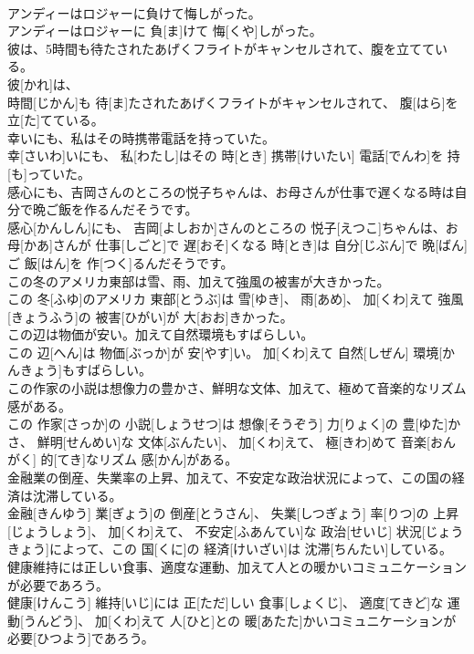 \documentclass[8pt]{extreport}
\begin{document}
\begin{CJK}{UTF8}{min}
\\	アンディーはロジャーに負けて悔しがった。	
\\	アンディーはロジャーに 負[ま]けて 悔[くや]しがった。
\\	彼は、5時間も待たされたあげくフライトがキャンセルされて、腹を立てている。	
\\	彼[かれ]は、 
\\	時間[じかん]も 待[ま]たされたあげくフライトがキャンセルされて、 腹[はら]を 立[た]てている。
\\	幸いにも、私はその時携帯電話を持っていた。	
\\	幸[さいわ]いにも、 私[わたし]はその 時[とき] 携帯[けいたい] 電話[でんわ]を 持[も]っていた。
\\	感心にも、吉岡さんのところの悦子ちゃんは、お母さんが仕事で遅くなる時は自分で晩ご飯を作るんだそうです。	
\\	感心[かんしん]にも、 吉岡[よしおか]さんのところの 悦子[えつこ]ちゃんは、お 母[かあ]さんが 仕事[しごと]で 遅[おそ]くなる 時[とき]は 自分[じぶん]で 晩[ばん]ご 飯[はん]を 作[つく]るんだそうです。
\\	この冬のアメリカ東部は雪、雨、加えて強風の被害が大きかった。	
\\	この 冬[ふゆ]のアメリカ 東部[とうぶ]は 雪[ゆき]、 雨[あめ]、 加[くわ]えて 強風[きょうふう]の 被害[ひがい]が 大[おお]きかった。
\\	この辺は物価が安い。加えて自然環境もすばらしい。	
\\	この 辺[へん]は 物価[ぶっか]が 安[やす]い。 加[くわ]えて 自然[しぜん] 環境[かんきょう]もすばらしい。
\\	この作家の小説は想像力の豊かさ、鮮明な文体、加えて、極めて音楽的なリズム感がある。	
\\	この 作家[さっか]の 小説[しょうせつ]は 想像[そうぞう] 力[りょく]の 豊[ゆた]かさ、 鮮明[せんめい]な 文体[ぶんたい]、 加[くわ]えて、 極[きわ]めて 音楽[おんがく] 的[てき]なリズム 感[かん]がある。
\\	金融業の倒産、失業率の上昇、加えて、不安定な政治状況によって、この国の経済は沈滞している。	
\\	金融[きんゆう] 業[ぎょう]の 倒産[とうさん]、 失業[しつぎょう] 率[りつ]の 上昇[じょうしょう]、 加[くわ]えて、 不安定[ふあんてい]な 政治[せいじ] 状況[じょうきょう]によって、この 国[くに]の 経済[けいざい]は 沈滞[ちんたい]している。
\\	健康維持には正しい食事、適度な運動、加えて人との暖かいコミュニケーションが必要であろう。	
\\	健康[けんこう] 維持[いじ]には 正[ただ]しい 食事[しょくじ]、 適度[てきど]な 運動[うんどう]、 加[くわ]えて 人[ひと]との 暖[あたた]かいコミュニケーションが 必要[ひつよう]であろう。

\end{CJK}
\end{document}
